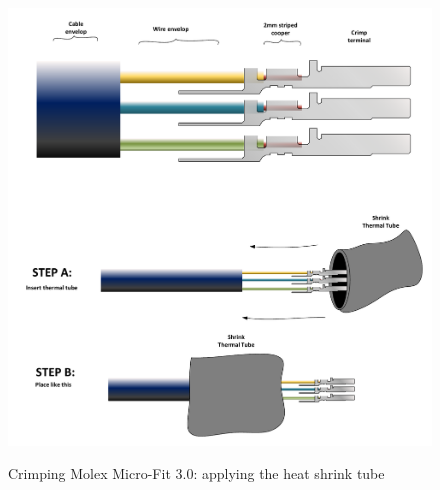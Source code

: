 \begin{figure}
  \centering
  \includegraphics[angle=90,width=1\columnwidth]{figs/body03/FIGCRIMP3.pdf}\\
  \caption[Crimping Molex Micro-Fit 3.0\texttrademark: applying the heat shrink tube]{Crimping Molex Micro-Fit 3.0\texttrademark: applying the heat shrink tube}
  \label{FIG:CRIMP3}
\end{figure}
